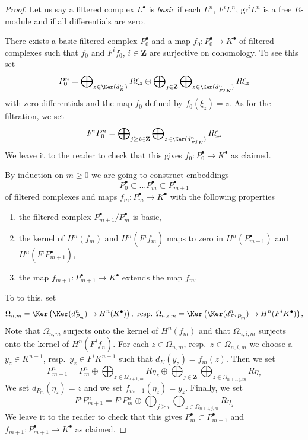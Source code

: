 \begin{proof}
Let us say a filtered complex $L^\bullet$ is {\it basic} if
each $L^n$, $F^iL^n$, $\text{gr}^iL^n$ is a free $R$-module
and if all differentials are zero.

\medskip\noindent
There exists a basic filtered complex $P_0^\bullet$ and a map
$f_0 : P_0^\bullet \to K^\bullet$ of filtered complexes such that
$f_0$ and $F^if_0$, $i \in \mathbf{Z}$ are surjective on cohomology.
To see this set
$$
P_0^n = \bigoplus\nolimits_{z \in \Ker(d_K^n)} R \xi_z
\oplus
\bigoplus\nolimits_{j \in \mathbf{Z}}
\bigoplus\nolimits_{z \in \Ker(d_{F^jK}^n)} R \xi_z
$$
with zero differentials and the map $f_0$ defined by
$f_0(\xi_z) = z$. As for the filtration, we set
$$
F^iP_0^n = \bigoplus\nolimits_{j \geq i \in \mathbf{Z}}
\bigoplus\nolimits_{z \in \Ker(d_{F^jK}^n)} R \xi_z
$$
We leave it to the reader to check that this gives
$f_0 : P_0^\bullet \to K^\bullet$ as claimed.

\medskip\noindent
By induction on $m \geq 0$ we are going to construct embeddings
$$
P_0^\bullet \subset \ldots P_m^\bullet \subset P_{m + 1}^\bullet
$$
of filtered complexes and maps $f_m : P_m^\bullet \to K^\bullet$
with the following properties
\begin{enumerate}
\item the filtered complex $P_{m + 1}^\bullet / P_m^\bullet$ is basic,
\item the kernel of $H^n(f_m)$ and $H^n(F^if_m)$ maps to zero in
$H^n(P_{m + 1}^\bullet)$ and $H^n(F^iP_{m + 1}^\bullet)$,
\item the map $f_{m + 1} : P_{m + 1}^\bullet \to K^\bullet$
extends the map $f_m$.
\end{enumerate}
To to this, set
$$
\Omega_{n, m} = \Ker\left(\Ker(d^n_{P_m}) \to H^n(K^\bullet)\right),
\text{ resp. }
\Omega_{n, i, m} = \Ker\left(\Ker(d^n_{F^iP_m}) \to H^n(F^iK^\bullet)\right),
$$
Note that $\Omega_{n, m}$ surjects onto the kernel of $H^n(f_m)$
and that $\Omega_{n, i, m}$ surjects onto the kernel of $H^n(F^if_n)$.
For each $z \in \Omega_{n, m}$, resp.\ $z \in \Omega_{n, i, m}$
we choose a $y_z \in K^{n - 1}$, resp.\ $y_z \in F^iK^{n - 1}$
such that $d_K(y_z) = f_m(z)$. Then we set
$$
P^n_{m + 1} = P_m^n \oplus
\bigoplus\nolimits_{z \in \Omega_{n + 1, m}} R \eta_z
\oplus
\bigoplus\nolimits_{j \in \mathbf{Z}}
\bigoplus\nolimits_{z \in \Omega_{n + 1, j, m}} R \eta_z
$$
We set $d_{P_m}(\eta_z) = z$ and we set $f_{m + 1}(\eta_z) = y_z$.
Finally, we set
$$
F^iP_{m + 1}^n = F^iP_m^n \oplus
\bigoplus\nolimits_{j \geq i}
\bigoplus\nolimits_{z \in \Omega_{n + 1, j, m}} R \eta_z
$$
We leave it to the reader to check that this gives
$P_m^\bullet \subset P_{m + 1}^\bullet$ and
$f_{m + 1} : P_{m + 1}^\bullet \to K^\bullet$ as claimed.


\end{proof}
